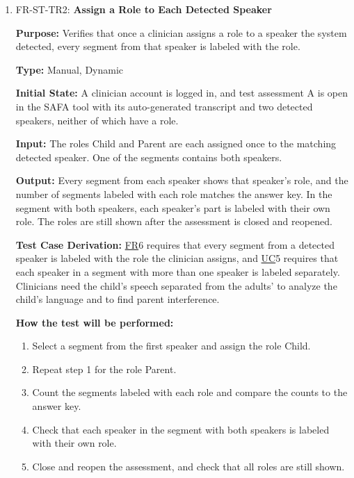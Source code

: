 \documentclass[12pt, titlepage]{article}
\newcommand{\srsfr}[1]{\href{https://github.com/Nour-Fawaz/MacaBoca/blob/main/pdfs/SRS/SRS.pdf}{FR}}
\newcommand{\srsuc}[1]{\href{https://github.com/Nour-Fawaz/MacaBoca/blob/main/pdfs/SRS/SRS.pdf}{UC}}
\renewcommand{\_}{\oldunderscore\allowbreak}
\begin{document}
\begin{enumerate}
  \item FR-ST-TR2: \textbf{Assign a Role to Each Detected Speaker\\}
  \begin{mdframed}[linewidth=0.5mm]
      \textbf{Purpose:} Verifies that once a clinician assigns a role to a speaker the system detected, every segment from that speaker is labeled with the role. \par
      \textbf{Type:} Manual, Dynamic \par
      \textbf{Initial State:} A clinician account is logged in, and test assessment A is open in the SAFA tool with its auto-generated transcript and two detected speakers, neither of which have a role. \par
      \textbf{Input:} The roles Child and Parent are each assigned once to the matching detected speaker. One of the segments contains both speakers. \par
      \textbf{Output:} Every segment from each speaker shows that speaker's role, and the number of segments labeled with each role matches the answer key. In the segment with both speakers, each speaker's part is labeled with their own role. The roles are still shown after the assessment is closed and reopened. \par
      \textbf{Test Case Derivation:} \srsfr*{6} requires that every segment from a detected speaker is labeled with the role the clinician assigns, and \srsuc*{5} requires that each speaker in a segment with more than one speaker is labeled separately. Clinicians need the child's speech separated from the adults' to analyze the child's language and to find parent interference. \par
      \textbf{How the test will be performed:}
      \begin{enumerate}
        \item[1.] Select a segment from the first speaker and assign the role Child.
        \item[2.] Repeat step 1 for the role Parent.
        \item[3.] Count the segments labeled with each role and compare the counts to the answer key.
        \item[4.] Check that each speaker in the segment with both speakers is labeled with their own role.
        \item[5.] Close and reopen the assessment, and check that all roles are still shown.
      \end{enumerate}
  \end{mdframed}


\end{enumerate}
\end{document}
